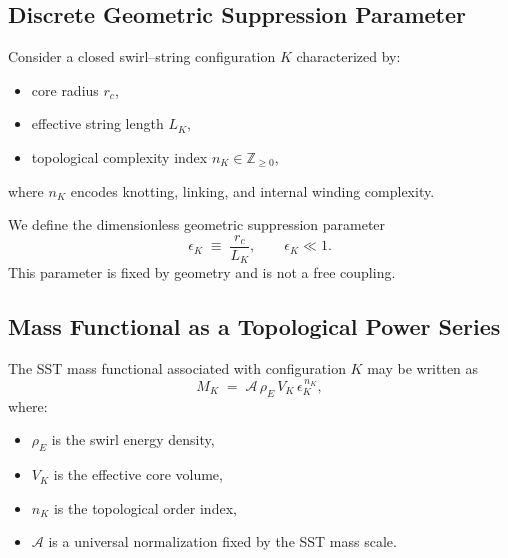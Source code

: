 \documentclass[11pt]{article}
\begin{document}
        \subsection{Discrete Geometric Suppression Parameter}

            Consider a closed swirl--string configuration $K$ characterized by:
            \begin{itemize}
                \item core radius $r_c$,
                \item effective string length $L_K$,
                \item topological complexity index $n_K \in \mathbb{Z}_{\ge 0}$,
            \end{itemize}
            where $n_K$ encodes knotting, linking, and internal winding complexity.

            We define the dimensionless geometric suppression parameter
            \begin{equation}
                \epsilon_K \;\equiv\; \frac{r_c}{L_K}, \qquad \epsilon_K \ll 1 .
            \end{equation}
            This parameter is fixed by geometry and is not a free coupling.

        \subsection{Mass Functional as a Topological Power Series}

            The SST mass functional associated with configuration $K$ may be written as
            \begin{equation}
                M_K
                \;=\;
                \mathcal{A}\,
                \rho_{\!E}\,
                V_K\,
                \epsilon_K^{\,n_K},
                \label{eq:SST_mass_power}
            \end{equation}
            where:
            \begin{itemize}
                \item $\rho_{\!E}$ is the swirl energy density,
                \item $V_K$ is the effective core volume,
                \item $n_K$ is the topological order index,
                \item $\mathcal{A}$ is a universal normalization fixed by the SST mass scale.
            \end{itemize}
\end{document}
